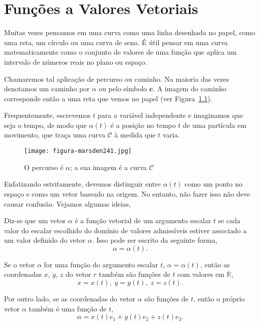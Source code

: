 %
\chapter{Funções a Valores Vetoriais}
%
Muitas vezes pensamos em uma curva como uma linha desenhada no papel, como uma reta, um círculo ou uma curva de seno. É útil pensar em uma curva matematicamente como o conjunto de valores de uma função que aplica um intervalo de números reais no plano ou espaço.

Chamaremos tal aplicação de percurso ou caminho. Na maioria das vezes denotamos um caminho por \(\alpha\) ou pelo símbolo $\mathbf{c}$. A imagem do caminho corresponde então a uma reta que vemos no papel (ver Figura~\ref{fig:241}).

Frequentemente, escrevemos \(t\) para a variável independente e imaginamos que seja o tempo, de modo que \(\alpha(t)\) é a posição no tempo \(t\) de uma partícula em movimento, que traça uma curva \(\mathcal{C}\) à medida que \(t\) varia.

\begin{figure}[!ht]
  \centering
  \texttt{[image: figura-marsden241.jpg]}
  \caption{O percurso é \(\alpha\); a sua imagem é a curva \(\mathcal{C}\)}\label{fig:241}
\end{figure}

Enfatizando estritamente, devemos distinguir entre \(\alpha(t)\) como um ponto no espaço e como um vetor baseado na origem. No entanto, não fazer isso não deve causar confusão. Vejamos algumas ideias,

Diz-se que um vetor \(\alpha\) é a função vetorial
de um argumento escalar \(t\) se cada valor do escalar escolhido
do domínio de valores admissíveis estiver associado a
um valor definido do vetor \(\alpha\). Isso pode ser escrito da seguinte forma,
\begin{equation*}
\alpha= \alpha(t). 
\end{equation*}

Se o vetor \(\alpha\) for uma função do argumento escalar \(t\),
\(\alpha =\alpha(t)\), então as coordenadas \(x\), \(y\), \(z\) do vetor \(r\) também são funções de \(t\) com valores em \(\mathbb{R}\), 
\begin{equation*}
x = x(t),\;  y = y(t),\;  z = z(t). 
\end{equation*}

Por outro lado, se as coordenadas do vetor \(\alpha\) são funções de \(t\), então o próprio vetor \(\alpha\) também é uma função de \(t\),
\begin{equation*}
\alpha = x(t)e_{1} + y(t)e_{2} + z(t)e_{3}. 
\end{equation*}

